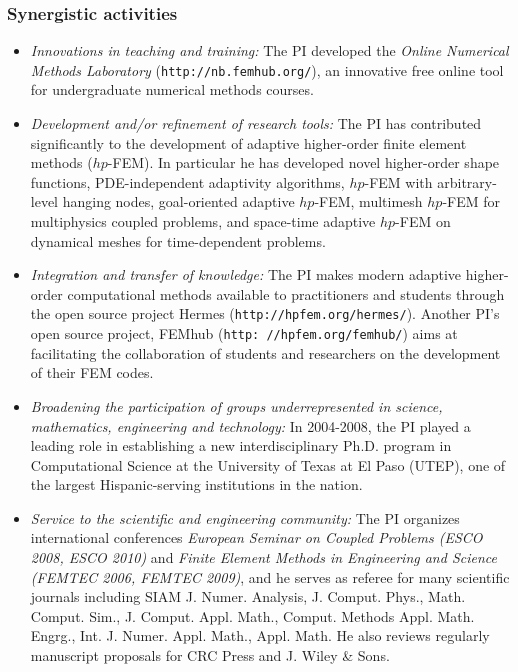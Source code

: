 \documentclass[11pt,letterpaper]{article}
\begin{document}
\subsubsection*{Synergistic activities}

\begin{itemize}
\item {\em Innovations in teaching and training:} 
      The PI developed the {\em Online Numerical Methods Laboratory} ({\tt http://nb.femhub.org/}), 
      an innovative free online tool for undergraduate numerical methods courses. 
\item {\em Development and/or refinement of research tools:} 
      The PI has contributed significantly to the development
      of adaptive higher-order finite element methods ($hp$-FEM). In particular 
      he has developed novel higher-order shape functions, PDE-independent adaptivity 
      algorithms, $hp$-FEM with arbitrary-level hanging nodes, goal-oriented adaptive
      $hp$-FEM, multimesh $hp$-FEM for multiphysics coupled problems, and 
      space-time adaptive $hp$-FEM on dynamical meshes for time-dependent problems. 
\item {\em Integration and transfer of knowledge:} 
      The PI makes modern adaptive higher-order computational methods 
      available to practitioners and students through the open 
      source project Hermes ({\tt http://hpfem.org/hermes/}). 
      Another PI's open source project, FEMhub ({\tt http: //hpfem.org/femhub/}) 
      aims at facilitating the collaboration of students and researchers 
      on the development of their FEM codes.
\item {\em Broadening the participation of groups underrepresented in science, mathematics, 
      engineering and technology:}
      In 2004-2008, the PI played a leading role in establishing a new interdisciplinary 
      Ph.D. program in Computational Science at the University of Texas at El Paso (UTEP),
      one of the largest Hispanic-serving institutions in the nation.
\item {\em Service to the scientific and engineering community:} 
The PI organizes international conferences 
{\em European Seminar on Coupled Problems (ESCO 2008, ESCO 2010)}
and {\em Finite Element Methods in Engineering and Science 
(FEMTEC 2006, FEMTEC 2009)}, and he serves as referee for many scientific journals including 
SIAM J. Numer. Analysis, J. Comput. Phys., Math. Comput. Sim., 
J. Comput. Appl. Math., Comput. Methods Appl. Math. Engrg., Int. J. Numer. Appl. Math., 
Appl. Math. He also reviews regularly manuscript proposals for CRC Press and 
J. Wiley \& Sons. 
\end{itemize}
\end{document}

